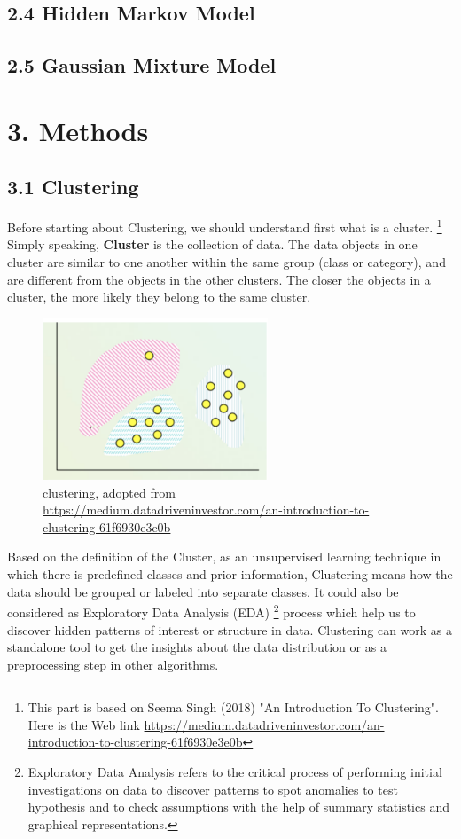\documentclass[nobib]{tufte-handout}
\begin{document}
\subsection{2.4 Hidden Markov Model}

\subsection{2.5 Gaussian Mixture Model}


\clearpage
\bigskip
\section{\textbf{3. Methods}}
\subsection{\textbf{3.1 Clustering}}


Before starting about Clustering, we should understand first what is a cluster. \footnote{This part is based on Seema Singh
 (2018) "An Introduction To Clustering". Here is the Web link \url{https://medium.datadriveninvestor.com/an-introduction-to-clustering-61f6930e3e0b}} Simply speaking,  \textbf{Cluster} is the collection of data. The data objects in one cluster are similar to one another within the same group (class or category),  and are different from the objects in the other clusters. 
The closer the objects in a cluster, the more likely they belong to the same cluster.

\begin{figure}
 \includegraphics[width=0.6\textwidth]{clustering.png}
  \caption{clustering, adopted from \url{https://medium.datadriveninvestor.com/an-introduction-to-clustering-61f6930e3e0b}}
\end{figure}

Based on the definition of the Cluster,  as an unsupervised learning technique in which there is predefined classes and prior information, Clustering means how the data should be grouped or labeled into separate classes. 
It could also be considered as Exploratory Data Analysis (EDA) \footnote{Exploratory Data Analysis refers to the critical process of performing initial investigations on data to discover patterns to spot anomalies to test hypothesis and to check assumptions with the help of summary statistics and graphical representations.} process which help us to discover hidden patterns of interest or structure in data. Clustering can work as a standalone tool to get the insights about the data distribution or as a preprocessing step in other algorithms.
\end{document}
